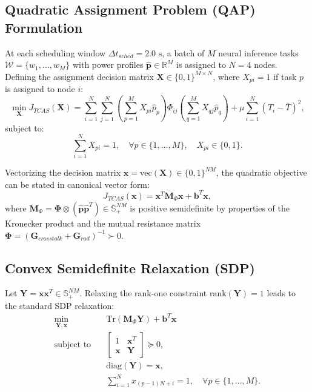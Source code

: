 \documentclass[11pt,a4paper]{article}
\begin{document}
\subsection{Quadratic Assignment Problem (QAP) Formulation}
At each scheduling window $\Delta t_{sched} = 2.0\text{ s}$, a batch of $M$ neural inference tasks $\mathcal{W} = \{w_1, \dots, w_M\}$ with power profiles $\hat{\mathbf{p}} \in \mathbb{R}^M$ is assigned to $N=4$ nodes. Defining the assignment decision matrix $\mathbf{X} \in \{0, 1\}^{M \times N}$, where $X_{pi} = 1$ if task $p$ is assigned to node $i$:
\begin{equation}
\min_{\mathbf{X}} J_{TCAS}(\mathbf{X}) = \sum_{i=1}^N \sum_{j=1}^N \left( \sum_{p=1}^M X_{pi} \hat{p}_p \right) \Phi_{ij} \left( \sum_{q=1}^M X_{qj} \hat{p}_q \right) + \mu \sum_{i=1}^N \left( T_i - \bar{T} \right)^2,
\end{equation}
subject to:
\begin{equation}
\sum_{i=1}^N X_{pi} = 1, \quad \forall p \in \{1, \dots, M\}, \quad X_{pi} \in \{0, 1\}.
\end{equation}

Vectorizing the decision matrix $\mathbf{x} = \text{vec}(\mathbf{X}) \in \{0, 1\}^{NM}$, the quadratic objective can be stated in canonical vector form:
\begin{equation}
J_{TCAS}(\mathbf{x}) = \mathbf{x}^T \mathbf{M}_{\Phi} \mathbf{x} + \mathbf{b}^T \mathbf{x},
\end{equation}
where $\mathbf{M}_{\Phi} = \mathbf{\Phi} \otimes (\hat{\mathbf{p}} \hat{\mathbf{p}}^T) \in \mathbb{S}_+^{NM}$ is positive semidefinite by properties of the Kronecker product and the mutual resistance matrix $\mathbf{\Phi} = (\mathbf{G}_{crosstalk} + \mathbf{G}_{rad})^{-1} \succ 0$.

\subsection{Convex Semidefinite Relaxation (SDP)}
Let $\mathbf{Y} = \mathbf{x} \mathbf{x}^T \in \mathbb{S}_+^{NM}$. Relaxing the rank-one constraint $\text{rank}(\mathbf{Y}) = 1$ leads to the standard SDP relaxation:
\begin{align}
\min_{\mathbf{Y}, \mathbf{x}} & \quad \text{Tr}(\mathbf{M}_{\Phi} \mathbf{Y}) + \mathbf{b}^T \mathbf{x} \\
\text{subject to} & \quad \begin{bmatrix} 1 & \mathbf{x}^T \\ \mathbf{x} & \mathbf{Y} \end{bmatrix} \succeq 0, \\
& \quad \text{diag}(\mathbf{Y}) = \mathbf{x}, \\
& \quad \sum_{i=1}^N x_{(p-1)N + i} = 1, \quad \forall p \in \{1, \dots, M\}.
\end{align}
\end{document}

